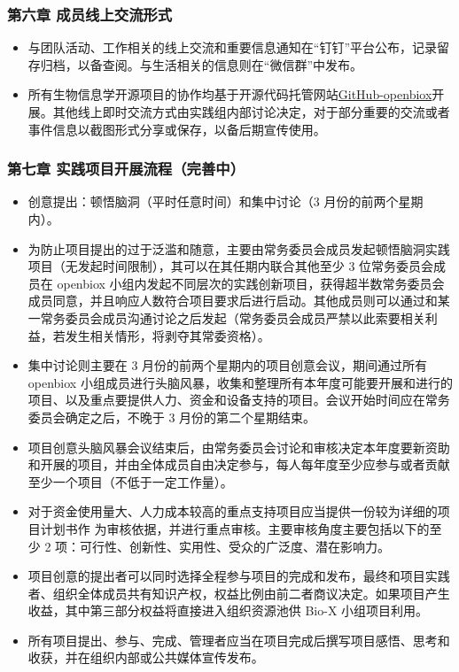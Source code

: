 \documentclass[]{article}
\begin{document}
\subsubsection{第六章 成员线上交流形式}\label{-}

\begin{itemize}
\item
  与团队活动、工作相关的线上交流和重要信息通知在``钉钉''平台公布，记录留存归档，以备查阅。与生活相关的信息则在``微信群''中发布。
\item
  所有生物信息学开源项目的协作均基于开源代码托管网站\href{https://github.com/openbiox}{GitHub-openbiox}开展。其他线上即时交流方式由实践组内部讨论决定，对于部分重要的交流或者事件信息以截图形式分享或保存，以备后期宣传使用。
\end{itemize}

\subsubsection{第七章 实践项目开展流程（完善中）}\label{-}

\begin{itemize}
\item
  创意提出：顿悟脑洞（平时任意时间）和集中讨论（3 月份的前两个星期内）。
\item
  为防止项目提出的过于泛滥和随意，主要由常务委员会成员发起顿悟脑洞实践项目（无发起时间限制），其可以在其任期内联合其他至少
  3 位常务委员会成员在 openbiox
  小组内发起不同层次的实践创新项目，获得超半数常务委员会成员同意，并且响应人数符合项目要求后进行启动。其他成员则可以通过和某一常务委员会成员沟通讨论之后发起（常务委员会成员严禁以此索要相关利益，若发生相关情形，将剥夺其常委资格）。
\item
  集中讨论则主要在 3 月份的前两个星期内的项目创意会议，期间通过所有
  openbiox
  小组成员进行头脑风暴，收集和整理所有本年度可能要开展和进行的项目、以及重点要提供人力、资金和设备支持的项目。会议开始时间应在常务委员会确定之后，不晚于
  3 月份的第二个星期结束。
\item
  项目创意头脑风暴会议结束后，由常务委员会讨论和审核决定本年度要新资助和开展的项目，并由全体成员自由决定参与，每人每年度至少应参与或者贡献至少一个项目（不低于一定工作量）。
\item
  对于资金使用量大、人力成本较高的重点支持项目应当提供一份较为详细的项目计划书作
  为审核依据，并进行重点审核。主要审核角度主要包括以下的至少 2
  项：可行性、创新性、实用性、受众的广泛度、潜在影响力。
\item
  项目创意的提出者可以同时选择全程参与项目的完成和发布，最终和项目实践者、组织全体成员共有知识产权，权益比例由前二者商议决定。如果项目产生收益，其中第三部分权益将直接进入组织资源池供
  Bio-X 小组项目利用。
\item
  所有项目提出、参与、完成、管理者应当在项目完成后撰写项目感悟、思考和收获，并在组织内部或公共媒体宣传发布。
\end{itemize}
\end{document}
